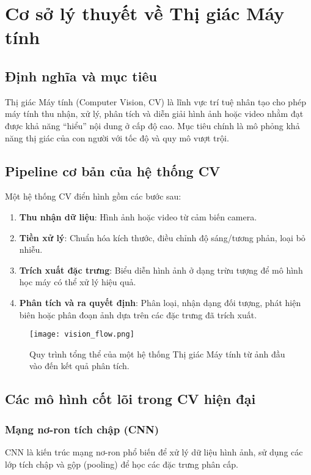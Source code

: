 

\section{Cơ sở lý thuyết về Thị giác Máy tính}

\subsection{Định nghĩa và mục tiêu}
Thị giác Máy tính (Computer Vision, CV) là lĩnh vực trí tuệ nhân tạo cho phép máy tính thu nhận, xử lý, phân tích và diễn giải hình ảnh hoặc video nhằm đạt được khả năng “hiểu” nội dung ở cấp độ cao. Mục tiêu chính là mô phỏng khả năng thị giác của con người với tốc độ và quy mô vượt trội.

\subsection{Pipeline cơ bản của hệ thống CV}
Một hệ thống CV điển hình gồm các bước sau:

\begin{enumerate}
    \item \textbf{Thu nhận dữ liệu}: Hình ảnh hoặc video từ cảm biến camera.
    \item \textbf{Tiền xử lý}: Chuẩn hóa kích thước, điều chỉnh độ sáng/tương phản, loại bỏ nhiễu.
    \item \textbf{Trích xuất đặc trưng}: Biểu diễn hình ảnh ở dạng trừu tượng để mô hình học máy có thể xử lý hiệu quả.
    \item \textbf{Phân tích và ra quyết định}: Phân loại, nhận dạng đối tượng, phát hiện biên hoặc phân đoạn ảnh dựa trên các đặc trưng đã trích xuất.
\end{enumerate}

\begin{figure}[h]
    \centering
    \texttt{[image: vision\_flow.png]}
    \caption{Quy trình tổng thể của một hệ thống Thị giác Máy tính từ ảnh đầu vào đến kết quả phân tích.}
    \label{fig:cv_pipeline}
\end{figure}

\subsection{Các mô hình cốt lõi trong CV hiện đại}
\subsubsection{Mạng nơ-ron tích chập (CNN)}
CNN là kiến trúc mạng nơ-ron phổ biến để xử lý dữ liệu hình ảnh, sử dụng các lớp tích chập và gộp (pooling) để học các đặc trưng phân cấp.

